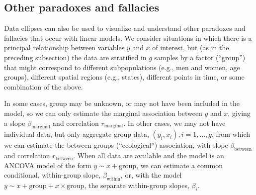 \subsection{Other paradoxes and fallacies}

Data ellipses can also be used to visualize and understand other paradoxes and
fallacies that occur with linear models.  We consider situations in which there
is a principal relationship between variables $y$ and $x$ of interest, but (as in the preceding subsection) the data
are stratified in $g$  samples by a factor (``group'') that might correspond
to different subpopulations (e.g., men and women, age groups),
different spatial regions (e.g., states), different points in time, or some
combination of the above.

In some cases, group may be unknown, or may not have been included in the model,
so we can only estimate the marginal association between $y$ and $x$,
giving a slope $\beta_{\textrm{marginal}}$ and correlation $r_{\textrm{marginal}}$.
In other cases, we may not have individual data, but only aggregate group
data, $(\bar{y}_i, \bar{x}_i), i=1, \dots , g$, from which we can estimate
the between-groups (``ecological'') association, with slope
$\beta_{\textrm{between}}$ and correlation $r_{\textrm{between}}$.
When all data are available and the model is an ANCOVA model of the form
$y \sim x + \textrm{group}$,
we can estimate a common conditional, within-group slope,
$\beta_{\textrm{within}}$, or, with the model $y \sim x + \textrm{group} + x \times \textrm{group}$,
the separate within-group slopes, $\beta_i$.


